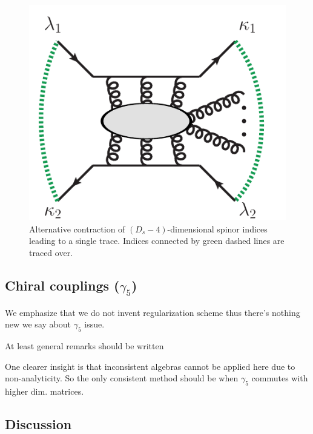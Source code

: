 \begin{figure}[]
  \begin{center}
  	\includegraphics[scale=0.5]
    {figures/singleTrace.pdf}
\end{center} 
\caption{Alternative contraction of $(D_s-4)$-dimensional spinor indices leading to a
single trace. Indices connected by green dashed lines are traced
over.}
\label{fig_SingleTrace}
\end{figure}





\subsection{Chiral couplings ($\gamma_5$)}


We emphasize that we do not invent regularization scheme thus there's nothing new we say about $\gamma_5$ issue.

At least general remarks should be written 

One clearer insight is that inconsistent algebras cannot be applied here due to non-analyticity.
So the only consistent method should be when $\gamma_5$ commutes with higher dim. matrices.


\subsection{Discussion}
\label{sec:dshel_discussion}

